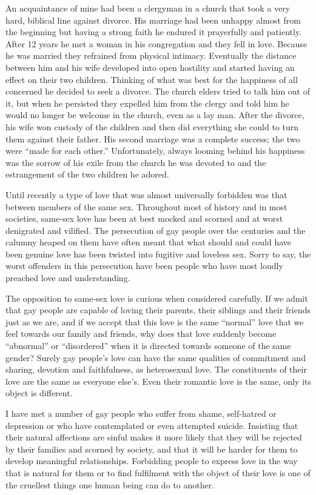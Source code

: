 \documentclass[10pt, openright]{book}
\begin{document}
An acquaintance of mine had been a clergyman in a church that took a very hard, biblical line against divorce. His marriage had been unhappy almost from the beginning but having a strong faith he endured it prayerfully and patiently. After 12 years he met a woman in his congregation and they fell in love. Because he was married they refrained from physical intimacy. Eventually the distance between him and his wife developed into open hostility and started having an effect on their two children. Thinking of what was best for the happiness of all concerned he decided to seek a divorce. The church elders tried to talk him out of it, but when he persisted they expelled him from the clergy and told him he would no longer be welcome in the church, even as a lay man. After the divorce, his wife won custody of the children and then did everything she could to turn them against their father. His second marriage was a complete success; the two were “made for each other.” Unfortunately, always looming behind his happiness was the sorrow of his exile from the church he was devoted to and the estrangement of the two children he adored.


Until recently a type of love that was almost universally forbidden was that between members of the same sex. Throughout most of history and in most societies, same-sex love has been at best mocked and scorned and at worst denigrated and vilified. The persecution of gay people over the centuries and the calumny heaped on them have often meant that what should and could have been genuine love has been twisted into fugitive and loveless sex. Sorry to say, the worst offenders in this persecution have been people who have most loudly preached love and understanding.


The opposition to same-sex love is curious when considered carefully. If we admit that gay people are capable of loving their parents, their siblings and their friends just as we are, and if we accept that this love is the same “normal” love that we feel towards our family and friends, why does that love suddenly become “abnormal” or “disordered” when it is directed towards someone of the same gender? Surely gay people’s love can have the same qualities of commitment and sharing, devotion and faithfulness, as heterosexual love. The constituents of their love are the same as everyone else’s. Even their romantic love is the same, only its object is different.


I have met a number of gay people who suffer from shame, self-hatred or depression or who have contemplated or even attempted suicide. Insisting that their natural affections are sinful makes it more likely that they will be rejected by their families and scorned by society, and that it will be harder for them to develop meaningful relationships. Forbidding people to express love in the way that is natural for them or to find fulfilment with the object of their love is one of the cruellest things one human being can do to another.
\end{document}
